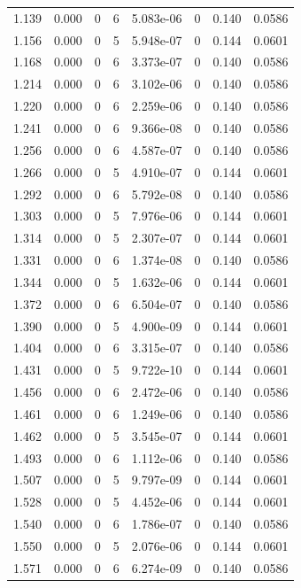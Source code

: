 \documentclass[preview]{standalone}
\begin{document}
{{{\begin{tabular}{L{1.2cm}C{1.2cm} C{0.3cm}C{0.5cm} C{1.4cm}C{1.4cm} C{1.4cm}C{1.4cm}}
  1.139  &  0.000  & 0     &  6 &  5.083e-06  & 0  & 0.140 &  0.0586   \\ 
  1.156  &  0.000  & 0     &  5 &  5.948e-07  & 0  & 0.144 &  0.0601   \\ 
  1.168  &  0.000  & 0     &  6 &  3.373e-07  & 0  & 0.140 &  0.0586   \\ 
  1.214  &  0.000  & 0     &  6 &  3.102e-06  & 0  & 0.140 &  0.0586   \\ 
  1.220  &  0.000  & 0     &  6 &  2.259e-06  & 0  & 0.140 &  0.0586   \\ 
  1.241  &  0.000  & 0     &  6 &  9.366e-08  & 0  & 0.140 &  0.0586   \\ 
  1.256  &  0.000  & 0     &  6 &  4.587e-07  & 0  & 0.140 &  0.0586   \\ 
  1.266  &  0.000  & 0     &  5 &  4.910e-07  & 0  & 0.144 &  0.0601   \\ 
  1.292  &  0.000  & 0     &  6 &  5.792e-08  & 0  & 0.140 &  0.0586   \\ 
  1.303  &  0.000  & 0     &  5 &  7.976e-06  & 0  & 0.144 &  0.0601   \\ 
  1.314  &  0.000  & 0     &  5 &  2.307e-07  & 0  & 0.144 &  0.0601   \\ 
  1.331  &  0.000  & 0     &  6 &  1.374e-08  & 0  & 0.140 &  0.0586   \\ 
  1.344  &  0.000  & 0     &  5 &  1.632e-06  & 0  & 0.144 &  0.0601   \\ 
  1.372  &  0.000  & 0     &  6 &  6.504e-07  & 0  & 0.140 &  0.0586   \\ 
  1.390  &  0.000  & 0     &  5 &  4.900e-09  & 0  & 0.144 &  0.0601   \\ 
  1.404  &  0.000  & 0     &  6 &  3.315e-07  & 0  & 0.140 &  0.0586   \\ 
  1.431  &  0.000  & 0     &  5 &  9.722e-10  & 0  & 0.144 &  0.0601   \\ 
  1.456  &  0.000  & 0     &  6 &  2.472e-06  & 0  & 0.140 &  0.0586   \\ 
  1.461  &  0.000  & 0     &  6 &  1.249e-06  & 0  & 0.140 &  0.0586   \\ 
  1.462  &  0.000  & 0     &  5 &  3.545e-07  & 0  & 0.144 &  0.0601   \\ 
  1.493  &  0.000  & 0     &  6 &  1.112e-06  & 0  & 0.140 &  0.0586   \\ 
  1.507  &  0.000  & 0     &  5 &  9.797e-09  & 0  & 0.144 &  0.0601   \\ 
  1.528  &  0.000  & 0     &  5 &  4.452e-06  & 0  & 0.144 &  0.0601   \\ 
  1.540  &  0.000  & 0     &  6 &  1.786e-07  & 0  & 0.140 &  0.0586   \\ 
  1.550  &  0.000  & 0     &  5 &  2.076e-06  & 0  & 0.144 &  0.0601   \\ 
  1.571  &  0.000  & 0     &  6 &  6.274e-09  & 0  & 0.140 &  0.0586   \\ 
\hline 
\end{tabular} 

}}}
\end{document}

